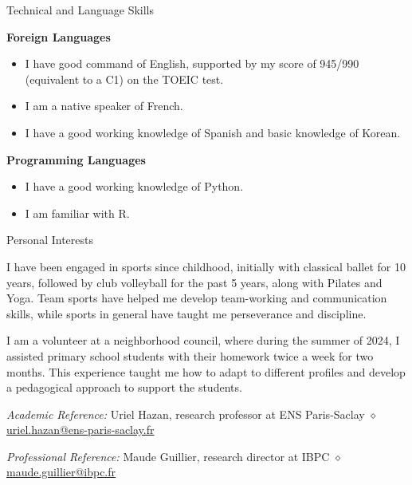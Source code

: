 \documentclass[
	10pt,
]{style} %
\begin{document}
\begin{rSection}{Technical and Language Skills}

	\textbf{Foreign Languages}
	\begin{itemize}[noitemsep, topsep=0pt, left=0pt]
		\item I have good command of English, supported by my score of 945/990 (equivalent to a C1) on the TOEIC test.
		\item I am a native speaker of French.
		\item I have a good working knowledge of Spanish and basic knowledge of Korean.
	\end{itemize}
	\textbf{Programming Languages}
	\begin{itemize}[noitemsep, topsep=0pt, left=0pt]
		\item I have a good working knowledge of Python.
		\item I am familiar with R.
	\end{itemize}

\end{rSection}



\begin{rSection}{Personal Interests}
	\vspace{-1em}
	\begin{rSubsection}{}{}{}{}
		\item I have been engaged in sports since childhood, initially with classical ballet for 10 years, followed by club volleyball for the past 5 years, along with Pilates and Yoga. Team sports have helped me develop team-working and communication skills, while sports in general have taught me perseverance and discipline.
		\item I am a volunteer at a neighborhood council, where during the summer of 2024, I assisted primary school students with their homework twice a week for two months. This experience taught me how to adapt to different profiles and develop a pedagogical approach to support the students.
	\end{rSubsection}

\end{rSection}



\begin{rReferences}
	\vspace{-0.5em}
    \item \textit{Academic Reference:} Uriel Hazan, research professor at ENS Paris-Saclay $\diamond$ \href{mailto:uriel.hazan@ens-paris-saclay.fr}{uriel.hazan@ens-paris-saclay.fr}
    \item \textit{Professional Reference:} Maude Guillier, research director at IBPC $\diamond$ \href{mailto:maude.guillier@ibpc.fr}{maude.guillier@ibpc.fr}
\end{rReferences}
\end{document}
